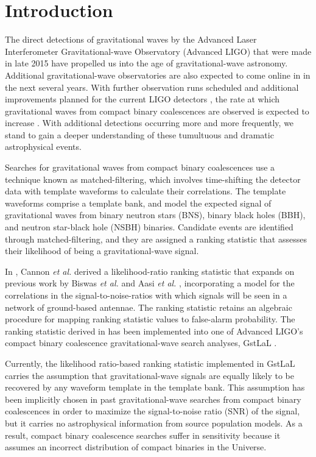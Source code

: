 \documentclass[twocolumn,showpacs,unsortedaddress,superscriptaddress,showkeys,nofootinbib,preprintnumbers,letterpaper]{revtex4-1}
\begin{document}

\section{Introduction}

The direct detections of gravitational waves by the Advanced Laser Interferometer Gravitational-wave Observatory (Advanced LIGO) that were made in late 2015 \cite{Abbott:2016blz, Abbott:2016nmj, TheLIGOScientific:2016pea} have propelled us into the age of gravitational-wave astronomy. Additional gravitational-wave observatories are also expected to come online in in the next several years. With further observation runs scheduled and additional improvements planned for the current LIGO detectors \cite{TheLIGOScientific:2016agk}, the rate at which gravitational waves from compact binary coalescences are observed is expected to increase \cite{Abbott:2016nhf}. With additional detections occurring more and more frequently, we stand to gain a deeper understanding of these tumultuous and dramatic astrophysical events. 

Searches for gravitational waves from compact binary coalescences use a technique known as matched-filtering, which involves time-shifting the detector data with template waveforms to calculate their correlations. The template waveforms comprise a template bank, and model the expected signal of gravitational waves from binary neutron stars (BNS), binary black holes (BBH), and neutron star-black hole (NSBH) binaries. Candidate events are identified through matched-filtering, and they are assigned a ranking statistic that assesses their likelihood of being a gravitational-wave signal. 

In \cite{2015arXiv150404632C}, Cannon {\it et al.} derived a likelihood-ratio ranking statistic that expands on previous work by Biswas {\it et al.} \cite{Biswas:2012tv} and Aasi {\it et al.} \cite{Aasi:2013vna}, incorporating a model for the correlations in the signal-to-noise-ratios with which signals will be seen in a network of ground-based antennae. The ranking statistic retains an algebraic procedure for mapping ranking statistic values to false-alarm probability. The ranking statistic derived in \cite{2015arXiv150404632C} has been implemented into one of Advanced LIGO's compact binary coalescence gravitational-wave search analyses, GstLaL \cite{Cannon:2011vi,Privitera:2013xza,Messick:2016}.

Currently, the likelihood ratio-based ranking statistic implemented in GstLaL carries the assumption that gravitational-wave signals are equally likely to be recovered by any waveform template in the template bank. This assumption has been implicitly chosen in past gravitational-wave searches from compact binary coalescences in order to maximize the signal-to-noise ratio (SNR) of the signal, but it carries no astrophysical information from source population models. As a result, compact binary coalescence searches suffer in sensitivity because it assumes an incorrect distribution of compact binaries in the Universe. 
\end{document}
